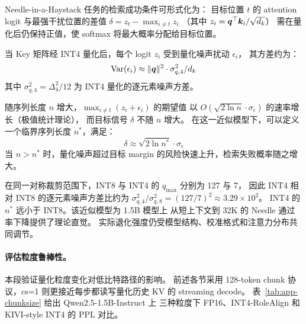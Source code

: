 Needle-in-a-Haystack 任务的检索成功条件可形式化为：
目标位置 $t$ 的 attention logit 与最强干扰位置的差值
$\delta = z_t - \max_{i \neq t} z_i$
（其中 $z_i = \bm{q}^\top \bm{k}_i / \sqrt{d_k}$）
需在量化后仍保持正值，使 softmax 将最大概率分配给目标位置。

当 Key 矩阵经 INT4 量化后，每个 logit $z_i$ 受到量化噪声扰动 $\epsilon_i$，
其方差约为：
\begin{equation}
  \text{Var}(\epsilon_i) \approx \|\bm{q}\|^2 \cdot \sigma_{q,4}^2 / d_k
\end{equation}
其中 $\sigma_{q,4}^2 = \Delta_4^2 / 12$ 为 INT4 量化的逐元素噪声方差。

随序列长度 $n$ 增大，$\max_{i \neq t} (z_i + \epsilon_i)$ 的期望值
以 $O(\sqrt{2 \ln n} \cdot \sigma_\epsilon)$ 的速率增长（极值统计理论），
而目标信号 $\delta$ 不随 $n$ 增大。
在这一近似模型下，可以定义一个临界序列长度 $n^*$，满足：
\begin{equation}
  \delta \approx \sqrt{2 \ln n^*} \cdot \sigma_\epsilon
\end{equation}
当 $n > n^*$ 时，量化噪声超过目标 margin 的风险快速上升，检索失败概率随之增大。

在同一对称裁剪范围下，INT8 与 INT4 的 $q_{\max}$ 分别为 127 与 7，
因此 INT4 相对 INT8 的逐元素噪声方差比约为
$\sigma_{q,4}^2 / \sigma_{q,8}^2 = (127/7)^2 \approx 3.29\times 10^2$。
INT4 的 $n^*$ 远小于 INT8。该近似模型为 1.5B 模型上
从短上下文到 32K 的 Needle 通过率下降提供了理论直觉。
实际退化强度仍受模型结构、校准格式和注意力分布共同调节。


\paragraph{评估粒度鲁棒性。}
\label{sec:app-chunksize}
本段验证量化粒度变化对低比特路径的影响。
前述各节采用 128-token chunk 协议，cs=1 则更接近每步都读写量化历史 KV 的 streaming decode。
表~\ref{tab:app-chunksize} 给出 Qwen2.5-1.5B-Instruct 上
三种粒度下 FP16、\mbox{INT4-RoleAlign} 和 KIVI-style INT4 的 PPL 对比。

\begin{table}[!htbp]
  \centering
  \caption{量化评估粒度敏感性（Qwen2.5-1.5B-Instruct，PPL，seed=1234）}
  \label{tab:app-chunksize}
\end{table}

